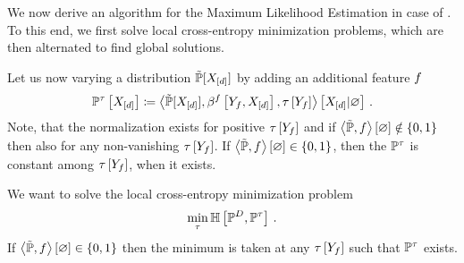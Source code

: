 






\label{sec:alternatingParEstMLN}

We now derive an algorithm for the Maximum Likelihood Estimation in case of \HybridLogicNetworks{}.
To this end, we first solve local cross-entropy minimization problems, which are then alternated to find global solutions.



Let us now varying a distribution $\tilde{\mathbb{P}}[X_{[d]}]$ by adding an additional feature $f$
\begin{align*}
    \mathbb{P}^{\tau}\left[X_{[d]}\right]
    \coloneqq \left\langle \tilde{\mathbb{P}}[X_{[d]}],\beta^{f}\left[Y_{f},X_{[d]}\right],\tau\left[Y_{f}\right]\right\rangle \left[ X_{[d]} | \varnothing \right] \, .
\end{align*}
Note, that the normalization exists for positive $\tau\left[Y_{f}\right]$ and if $\left\langle \tilde{\mathbb{P}},f\right\rangle \left[ \varnothing \right]\notin\{0,1\}$ then also for any non-vanishing $\tau\left[Y_{f}\right]$.
If $\left\langle \tilde{\mathbb{P}},f\right\rangle \left[ \varnothing \right]\in\{0,1\}$, then the $\mathbb{P}^{\tau}$ is constant among $\tau\left[Y_{f}\right]$, when it exists.

We want to solve the local cross-entropy minimization problem
\begin{align*}
    \min_{\tau} \mathbb{H}\left[\mathbb{P}^{D},\mathbb{P}^{\tau}\right] \,.
\end{align*}
If $\left\langle \tilde{\mathbb{P}},f\right\rangle \left[ \varnothing \right]\in\{0,1\}$ then the minimum is taken at any $\tau\left[Y_{f}\right]$ such that $\mathbb{P}^{\tau}$ exists.

